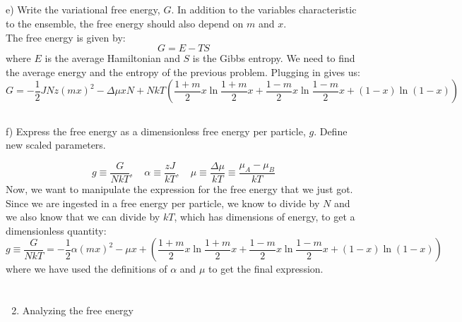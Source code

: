\documentclass[12pt]{article}
\begin{document}
\subsection{}
e) Write the variational free energy, $G$. In addition to the variables characteristic to the ensemble, the free energy should also depend on $m$ and $x$.\\
The free energy is given by:
\begin{equation}
  G=E-TS
\end{equation}
where $E$ is the average Hamiltonian and $S$ is the Gibbs entropy. We need to find the average energy and the entropy of the previous problem.
Plugging in gives us:
\begin{equation}
  G = -\frac{1}{2}J N z (m x)^{2} - \Delta \mu xN +NkT \left( \frac{1 + m}{2}x \ln \frac{1 + m}{2}x + \frac{1 - m}{2}x \ln \frac{1 - m}{2}x + (1 - x) \ln (1 - x) \right)
\end{equation}
\subsection{}



f) Express the free energy as a dimensionless free energy per particle, $g$. Define new scaled parameters.


\begin{equation*}
g \equiv \frac{G}{N k T}, \quad \alpha \equiv \frac{z J}{k T}, \quad \mu \equiv \frac{\Delta \mu}{k T} \equiv \frac{\mu_{A}-\mu_{B}}{k T} \tag{3}
\end{equation*}
Now, we want to manipulate the expression for the free energy that we just got. Since we are ingested in a free energy per particle, we know to divide by $N$ and we also know that we can divide by $kT$, which has dimensions of energy, to get a dimensionless quantity:
\begin{equation}
  g \equiv \frac{G}{N k T} = -\frac{1}{2} \alpha (m x)^{2} - \mu x + \left( \frac{1 + m}{2}x \ln \frac{1 + m}{2}x + \frac{1 - m}{2}x \ln \frac{1 - m}{2}x + (1 - x) \ln (1 - x) \right)
\end{equation}
where we have used the definitions of $\alpha$ and $\mu$ to get the final expression.
\section{}
\begin{enumerate}
  \setcounter{enumi}{1}
  \item Analyzing the free energy
\end{enumerate}
\end{document}
